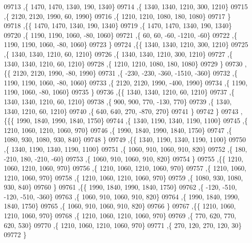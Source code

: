\begin{DoxyCode}
09713     ,\{  1470,  1470,  1340,   190,  1340\}
09714     ,\{  1340,  1340,  1210,   300,  1210\}
09715     ,\{  2120,  2120,  1990,    60,  1990\}
09716     ,\{  1210,  1210,  1080,   180,  1080\}
09717     \}
09718    ,\{\{  1470,  1470,  1340,   190,  1340\}
09719     ,\{  1470,  1470,  1340,   190,  1340\}
09720     ,\{  1190,  1190,  1060,   -80,  1060\}
09721     ,\{    60,    60,   -60, -1210,   -60\}
09722     ,\{  1190,  1190,  1060,   -80,  1060\}
09723     \}
09724    ,\{\{  1340,  1340,  1210,   300,  1210\}
09725     ,\{  1340,  1340,  1210,    60,  1210\}
09726     ,\{  1340,  1340,  1210,   300,  1210\}
09727     ,\{  1340,  1340,  1210,    60,  1210\}
09728     ,\{  1210,  1210,  1080,   180,  1080\}
09729     \}
09730    ,\{\{  2120,  2120,  1990,   -80,  1990\}
09731     ,\{  -230,  -230,  -360, -1510,  -360\}
09732     ,\{  1190,  1190,  1060,   -80,  1060\}
09733     ,\{  2120,  2120,  1990,  -400,  1990\}
09734     ,\{  1190,  1190,  1060,   -80,  1060\}
09735     \}
09736    ,\{\{  1340,  1340,  1210,    60,  1210\}
09737     ,\{  1340,  1340,  1210,    60,  1210\}
09738     ,\{   900,   900,   770,  -130,   770\}
09739     ,\{  1340,  1340,  1210,    60,  1210\}
09740     ,\{   640,   640,   270,  -870,   270\}
09741     \}
09742    \}
09743   ,\{\{\{  1990,  1840,  1990,  1840,  1750\}
09744     ,\{  1340,  1190,  1340,  1190,  1100\}
09745     ,\{  1210,  1060,  1210,  1060,   970\}
09746     ,\{  1990,  1840,  1990,  1840,  1750\}
09747     ,\{  1080,   930,  1080,   930,   840\}
09748     \}
09749    ,\{\{  1340,  1190,  1340,  1190,  1100\}
09750     ,\{  1340,  1190,  1340,  1190,  1100\}
09751     ,\{  1060,   910,  1060,   910,   820\}
09752     ,\{   180,  -210,   180,  -210,   -60\}
09753     ,\{  1060,   910,  1060,   910,   820\}
09754     \}
09755    ,\{\{  1210,  1060,  1210,  1060,   970\}
09756     ,\{  1210,  1060,  1210,  1060,   970\}
09757     ,\{  1210,  1060,  1210,  1060,   970\}
09758     ,\{  1210,  1060,  1210,  1060,   970\}
09759     ,\{  1080,   930,  1080,   930,   840\}
09760     \}
09761    ,\{\{  1990,  1840,  1990,  1840,  1750\}
09762     ,\{  -120,  -510,  -120,  -510,  -360\}
09763     ,\{  1060,   910,  1060,   910,   820\}
09764     ,\{  1990,  1840,  1990,  1840,  1750\}
09765     ,\{  1060,   910,  1060,   910,   820\}
09766     \}
09767    ,\{\{  1210,  1060,  1210,  1060,   970\}
09768     ,\{  1210,  1060,  1210,  1060,   970\}
09769     ,\{   770,   620,   770,   620,   530\}
09770     ,\{  1210,  1060,  1210,  1060,   970\}
09771     ,\{   270,   120,   270,   120,    30\}
09772     \}

\end{DoxyCode}
